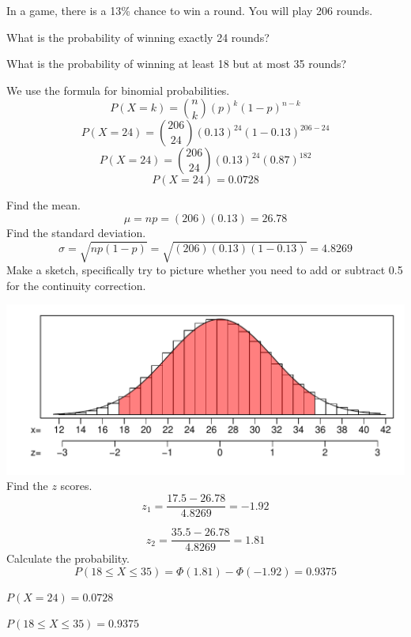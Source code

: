 
\begin{question}
In a game, there is a 13\% chance to win a round. You will play 206
rounds.
\begin{answerlist}
  \item What is the probability of winning exactly 24 rounds?
  \item What is the probability of winning at least 18 but at most 35 rounds?
\end{answerlist}
\end{question}

\begin{solution}
We use the formula for binomial probabilities.
\[P(X=k) = {n \choose k} (p)^{k}(1-p)^{n-k} \]
\[P(X=24) = {206 \choose 24} (0.13)^{24}(1-0.13)^{206-24} \]
\[P(X=24) = {206 \choose 24} (0.13)^{24}(0.87)^{182} \]
\[P(X=24) = 0.0728\]

Find the mean. \[\mu = np = (206)(0.13) = 26.78 \] Find the standard
deviation.
\[\sigma = \sqrt{np(1-p)} = \sqrt{(206)(0.13)(1-0.13)} = 4.8269 \] Make
a sketch, specifically try to picture whether you need to add or
subtract 0.5 for the continuity correction.

\includegraphics{binom_norm_sketch-1.pdf} Find the \(z\) scores.
\[z_1 = \frac{17.5-26.78}{4.8269} = -1.92 \]

\[z_2 = \frac{35.5-26.78}{4.8269} = 1.81 \] Calculate the probability.
\[P(18\le X \le 35) = \Phi(1.81) - \Phi(-1.92) = 0.9375 \]
\begin{answerlist}
  \item \(P(X=24) = 0.0728\)
  \item \(P(18 \le X \le 35) = 0.9375\)
\end{answerlist}
\end{solution}

